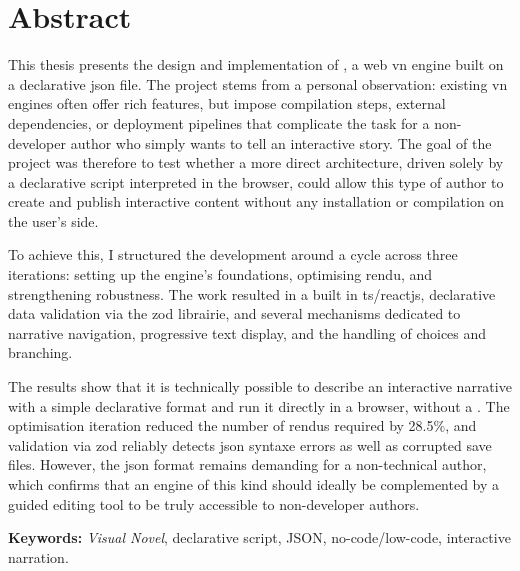 \section*{Abstract}

This thesis presents the design and implementation of \nsit, a web \acrlong{vn} engine built on a declarative \acrshort{json} file. The project stems from a personal observation: existing \acrlong{vn} engines often offer rich features, but impose compilation steps, external dependencies, or deployment pipelines that complicate the task for a non-developer author who simply wants to tell an interactive story. The goal of the project was therefore to test whether a more direct architecture, driven solely by a declarative script interpreted in the browser, could allow this type of author to create and publish interactive content without any installation or compilation on the user's side.

To achieve this, I structured the development around a  cycle across three iterations: setting up the engine's foundations, optimising \gls{rendu}, and strengthening robustness. The work resulted in a  built in \gls{ts}/\gls{reactjs}, declarative data validation via the \gls{zod} \gls{librairie}, and several mechanisms dedicated to narrative navigation, progressive text display, and the handling of choices and branching.

The results show that it is technically possible to describe an interactive narrative with a simple declarative format and run it directly in a browser, without a . The optimisation iteration reduced the number of \glspl{rendu} required by 28.5\%, and validation via \gls{zod} reliably detects \acrshort{json} \gls{syntaxe} errors as well as corrupted save files. However, the \acrshort{json} format remains demanding for a non-technical author, which confirms that an engine of this kind should ideally be complemented by a guided editing tool to be truly accessible to non-developer authors.

\medskip
\noindent\textbf{Keywords:} \textit{Visual Novel}, declarative script, JSON, no-code/low-code, interactive narration.
